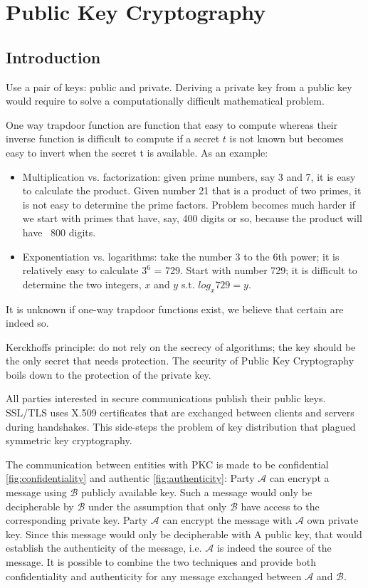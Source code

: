 \chapter{Public Key Cryptography}

\section{Introduction}
Use a pair of keys: public and private. Deriving a private key from a public key would require to solve a computationally difficult mathematical problem. 

One way trapdoor function are function that easy to compute whereas their inverse function is difficult to compute if a secret $t$ is not known but becomes easy to invert when the secret t is available. As an example:
\begin{itemize}
	\item Multiplication vs. factorization: given prime numbers, say 3 and 7, it is easy to calculate the product. Given number 21 that is a product of two primes, it is not easy to determine the prime factors. Problem becomes much harder if we start with primes that have, say, 400 digits or so, because the product will have ~800 digits.
	\item Exponentiation vs. logarithms: take the number 3 to the 6th power; it is relatively easy to calculate $3^6$ = 729. Start with number 729; it is difficult to determine the two integers, $x$ and $y$ s.t. $log_x 729 = y$. 
\end{itemize}

It is unknown if one-way trapdoor functions exist, we believe that certain are indeed so.


Kerckhoffs principle: do not rely on the secrecy of algorithms; the key should be the only secret that needs protection. The security of Public Key Cryptography boils down to the protection of the private key.

All parties interested in secure communications publish their public keys. SSL/TLS uses X.509 certificates that are exchanged between clients and servers during handshakes. This side-steps the problem of key distribution that plagued symmetric key cryptography. 

The communication between entities with PKC is made to be confidential \ref{fig:confidentiality} and authentic  \ref{fig:authenticity}: Party $\mathcal{A}$ can encrypt a message using $\mathcal{B}$ publicly available key. Such a message would only be decipherable by $\mathcal{B}$ under the assumption that only $\mathcal{B}$ have access to the corresponding private key.  Party $\mathcal{A}$ can encrypt the message with $\mathcal{A}$ own private key. Since this message would only be decipherable with A public key, that would establish the authenticity of the message, i.e. $\mathcal{A}$ is indeed the source of the message. It is possible to combine the two techniques and provide both confidentiality and authenticity for any message exchanged between $\mathcal{A}$ and $\mathcal{B}$.

